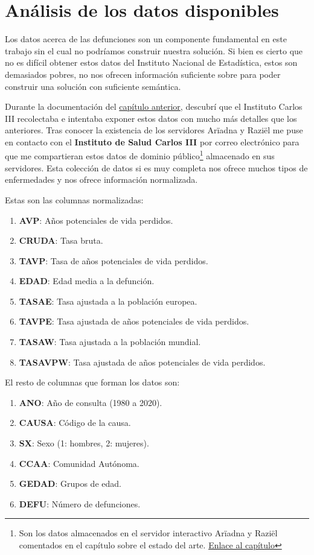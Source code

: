 \chapter{Análisis de los datos disponibles}
\label{cap:5}
Los datos acerca de las defunciones son un componente fundamental en este trabajo sin el cual no podríamos construir nuestra solución. Si bien es cierto que no es difícil obtener estos datos del Instituto Nacional de Estadística, estos son demasiados pobres, no nos ofrecen información suficiente sobre para poder construir una solución con suficiente semántica.

Durante la documentación del \hyperref[sec:estadoArte]{capítulo anterior}, descubrí que el Instituto Carlos III recolectaba e intentaba exponer estos datos con mucho más detalles que los anteriores. Tras conocer la existencia de los servidores Arïadna y Raziël me puse en contacto con el \textbf{Instituto de Salud Carlos III} por correo electrónico para que me compartieran estos datos de dominio público\footnote{Son los datos almacenados en el servidor interactivo Arïadna y Raziël comentados en el capítulo sobre el estado del arte. \hyperref[sec:estadoArte]{Enlace al capítulo}} almacenado en sus servidores. Esta colección de datos si es muy completa nos ofrece muchos tipos de enfermedades y nos ofrece información normalizada.

Estas son las columnas normalizadas:
\begin{enumerate}
\item \textbf{AVP}: Años potenciales de vida perdidos.
\item \textbf{CRUDA}: Tasa bruta.
\item \textbf{TAVP}: Tasa de años potenciales de vida perdidos.
\item \textbf{EDAD}: Edad media a la defunción.
\item \textbf{TASAE}: Tasa ajustada a la población europea.
\item \textbf{TAVPE}: Tasa ajustada de años potenciales de vida perdidos.
\item \textbf{TASAW}: Tasa ajustada a la población mundial.
\item \textbf{TASAVPW}: Tasa ajustada de años potenciales de vida perdidos.
\end{enumerate}

El resto de columnas que forman los datos son:
\begin{enumerate}
\item \textbf{ANO}: Año de consulta (1980 a 2020).
\item \textbf{CAUSA}: Código de la causa.
\item \textbf{SX}: Sexo (1: hombres, 2: mujeres).
\item \textbf{CCAA}: Comunidad Autónoma.
\item \textbf{GEDAD}: Grupos de edad.
\item \textbf{DEFU}: Número de defunciones.
\end{enumerate}

